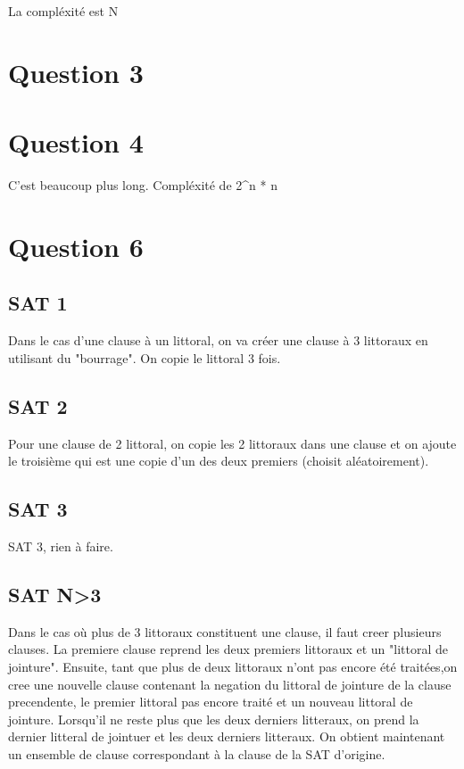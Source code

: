 \documentclass[a4paper,12pt]{report}
\begin{document}
La compléxité est N

\section*{Question 3}



\section*{Question 4}

C'est beaucoup plus long. Compléxité de 2^n * n

\section*{Question 6}

\subsection{SAT 1}

Dans le cas d'une clause à un littoral, on va créer une clause à 3 littoraux en utilisant du "bourrage". On copie le littoral 3 fois.

\subsection{SAT 2}

Pour une clause de 2 littoral, on copie les 2 littoraux dans une clause et on ajoute le troisième qui est une copie d'un des deux premiers (choisit aléatoirement).

\subsection{SAT 3}

SAT 3, rien à faire.

\subsection{SAT N>3}

Dans le cas où plus de 3 littoraux constituent une clause, il faut creer plusieurs clauses.
La premiere clause reprend les deux premiers littoraux et un "littoral de jointure". Ensuite,
tant que plus de deux littoraux n'ont pas encore été traitées,on cree une nouvelle clause contenant la negation du littoral de jointure de la clause precendente, le premier littoral pas encore traité et un nouveau littoral de jointure. Lorsqu'il ne reste plus que les deux derniers litteraux, on prend la dernier litteral de jointuer et les deux derniers litteraux.
On obtient maintenant un ensemble de clause correspondant à la clause de la SAT d'origine.
\end{document}
